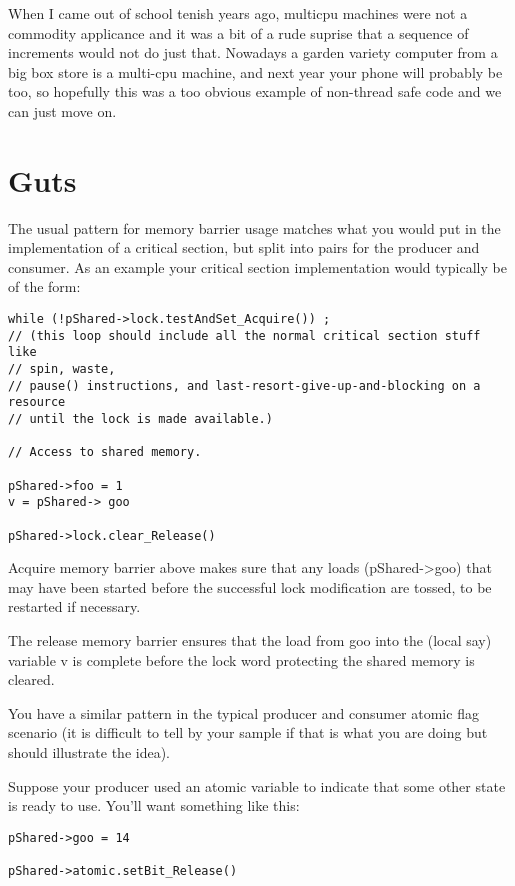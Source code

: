 When I came out of school tenish years ago, multicpu machines were not a commodity applicance and it was a bit of a rude suprise that a sequence of increments would not do just that.  Nowadays a garden variety computer from a big box store is a multi-cpu machine, and next year your phone will probably be too, so hopefully this was a too obvious example of non-thread safe code and we can just move on.



\section{Guts}

The usual pattern for memory barrier usage matches what you would put in the implementation of a critical section, but split into pairs for the producer and consumer. As an example your critical section implementation would typically be of the form:

\begin{lstlisting}
while (!pShared->lock.testAndSet_Acquire()) ;
// (this loop should include all the normal critical section stuff like
// spin, waste, 
// pause() instructions, and last-resort-give-up-and-blocking on a resource 
// until the lock is made available.)

// Access to shared memory.

pShared->foo = 1 
v = pShared-> goo

pShared->lock.clear_Release()
\end{lstlisting}

Acquire memory barrier above makes sure that any loads (pShared->goo) that may have been started before the successful lock modification are tossed, to be restarted if necessary.

The release memory barrier ensures that the load from goo into the (local say) variable v is complete before the lock word protecting the shared memory is cleared.

You have a similar pattern in the typical producer and consumer atomic flag scenario (it is difficult to tell by your sample if that is what you are doing but should illustrate the idea).

Suppose your producer used an atomic variable to indicate that some other state is ready to use. You'll want something like this:

\begin{lstlisting}
pShared->goo = 14

pShared->atomic.setBit_Release()
\end{lstlisting}

